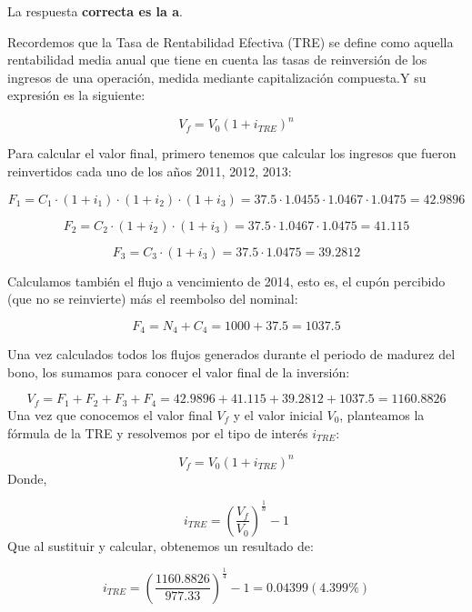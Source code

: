 \documentclass[
  letterpaper,
  DIV=11,
  numbers=noendperiod]{scrreprt}
\begin{document}
\begin{tcolorbox}[enhanced jigsaw, left=2mm, opacityback=0, colback=white, breakable, arc=.35mm, bottomrule=.15mm, rightrule=.15mm, toprule=.15mm, leftrule=.75mm, colframe=quarto-callout-tip-color-frame]
\begin{minipage}[t]{5.5mm}
\textcolor{quarto-callout-tip-color}{\faLightbulb}
\end{minipage}%
\begin{minipage}[t]{\textwidth - 5.5mm}

La respuesta \textbf{correcta es la a}.

Recordemos que la Tasa de Rentabilidad Efectiva (TRE) se define como
aquella rentabilidad media anual que tiene en cuenta las tasas de
reinversión de los ingresos de una operación, medida mediante
capitalización compuesta.Y su expresión es la siguiente:

\[V_f=V_0\left(1+i_{TRE}\right)^n\]

Para calcular el valor final, primero tenemos que calcular los ingresos
que fueron reinvertidos cada uno de los años 2011, 2012, 2013:

\[F_1=C_1\cdot\left(1+i_1\right)\cdot\left(1+i_2\right)\cdot\left(1+i_3\right)=37.5\cdot1.0455\cdot1.0467\cdot1.0475=42.9896\]

\[F_2=C_2\cdot\left(1+i_2\right)\cdot\left(1+i_3\right)=37.5\cdot1.0467\cdot1.0475=41.115\]

\[F_3=C_3\cdot\left(1+i_3\right)=37.5\cdot1.0475=39.2812\]

Calculamos también el flujo a vencimiento de 2014, esto es, el cupón
percibido (que no se reinvierte) más el reembolso del nominal:

\[F_4=N_4+C_4=1000+37.5=1037.5\]

Una vez calculados todos los flujos generados durante el periodo de
madurez del bono, los sumamos para conocer el valor final de la
inversión:

\[V_f=F_1+F_2+F_3+F_4=42.9896+41.115+39.2812+1037.5=1160.8826\] Una vez
que conocemos el valor final \(V_f\) y el valor inicial \(V_0\),
planteamos la fórmula de la TRE y resolvemos por el tipo de interés
\(i_{TRE}\):

\[V_f=V_0\left(1+i_{TRE}\right)^n\] Donde,

\[i_{TRE}=\left(\frac{V_f }{V_0 }\right)^{\frac{1 }{n }}-1\] Que al
sustituir y calcular, obtenemos un resultado de:

\[i_{TRE}=\left(\frac{ 1160.8826}{977.33 }\right)^{\frac{1 }{4 }}-1=0.04399(4.399\%)\]

\end{minipage}%
\end{tcolorbox}
\end{document}
